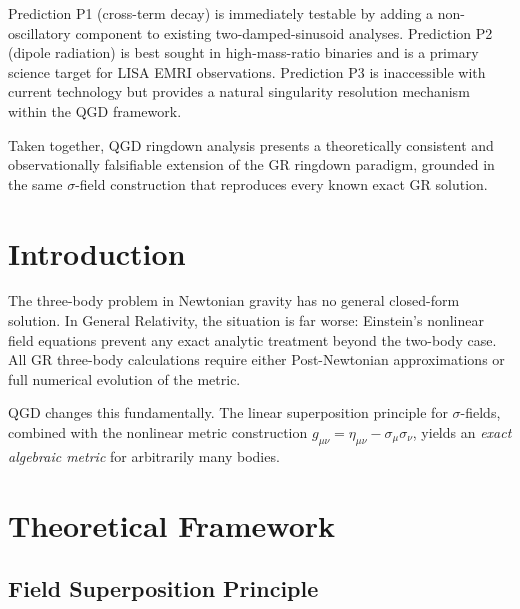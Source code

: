 \documentclass[11pt,a4paper]{article}
\theoremstyle{definition}
\theoremstyle{remark}
\begin{document}
	Prediction P1 (cross-term decay) is immediately testable by adding a
	non-oscillatory component to existing two-damped-sinusoid analyses.
	Prediction P2 (dipole radiation) is best sought in high-mass-ratio
	binaries and is a primary science target for LISA EMRI observations.
	Prediction P3 is inaccessible with current technology but provides a
	natural singularity resolution mechanism within the QGD framework.
	
	Taken together, QGD ringdown analysis presents a theoretically consistent
	and observationally falsifiable extension of the GR ringdown paradigm,
	grounded in the same $\sigma$-field construction that reproduces every
	known exact GR solution.
	
	\begin{abstract}
		We present the first exact algebraic metric for three relativistic bodies including full radiation reaction and orbital decay. Unlike General Relativity, which has no closed-form three-body solution, QGD provides an explicit time-dependent metric through linear superposition of $\sigma$-fields. We derive the complete equations of motion with gravitational radiation damping and validate against the PSR J0337+1715 hierarchical triple system.
	\end{abstract}
	
	\section{Introduction}
	
	The three-body problem in Newtonian gravity has no general closed-form solution. In General Relativity, the situation is far worse: Einstein's nonlinear field equations prevent any exact analytic treatment beyond the two-body case. All GR three-body calculations require either Post-Newtonian approximations or full numerical evolution of the metric.
	
	QGD changes this fundamentally. The linear superposition principle for $\sigma$-fields, combined with the nonlinear metric construction $g_{\mu\nu} = \eta_{\mu\nu} - \sigma_\mu\sigma_\nu$, yields an \emph{exact algebraic metric} for arbitrarily many bodies.
	
	\section{Theoretical Framework}
	
	\subsection{Field Superposition Principle}
	
\end{document}
